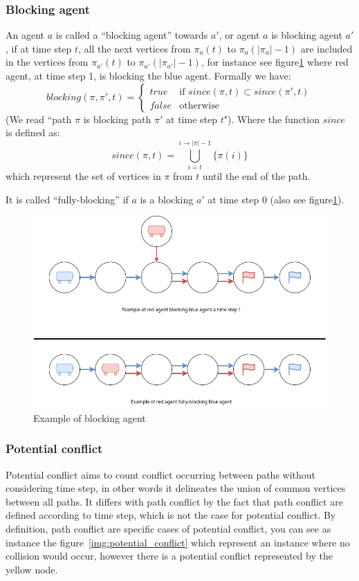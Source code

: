 \subsubsection{Blocking agent}\label{def:blocking_agent}
  An agent \(a\) is called a ``blocking agent'' towards \(a'\), or agent \(a\) is blocking agent \(a'\), if at time step \(t\), all the next vertices from \(\pi_a(t)\) to \(\pi_a(|\pi_a|-1)\) are included in the vertices from \(\pi_{a'}(t)\) to \(\pi_{a'}(|\pi_{a'}|-1)\), for instance see figure\ref{img:blocking_agent} where red agent, at time step 1, is blocking the blue agent. Formally we have: \
  \[
    blocking(\pi,\pi',t) = \begin{cases}
      true   & \text{if }  since(\pi,t) \subset  since(\pi',t) \\
      false  & \text{otherwise}
    \end{cases}
  \] (We read ``path \(\pi\) is blocking path \(\pi'\) at time step \(t\)"). Where the function \(since\) is defined as:
  \[
    since(\pi,t) = \bigcup_{i=t}^{i \rightarrow |\pi|-1} \{\pi(i)\}  
  \] which represent the set of vertices in \(\pi\) from \(t\) until the end of the path.
  
  It is called  ``fully-blocking''  if  \(a\) is a blocking \(a'\) at time step 0 (also see figure\ref{img:blocking_agent}). 
\begin{figure}[H]
  \centering
  \caption{Example of blocking agent}\label{img:blocking_agent}
  \includegraphics[width=\widthimg]{img/blocking_agent.drawio.png}
\end{figure}



\subsubsection{Potential conflict}
Potential conflict aims to count conflict occurring between paths without considering time step, in other words it delineates the union of common vertices between all paths. It differs with path conflict by the fact that path conflict are defined according to time step, which is not the case for potential conflict. By definition, path conflict are specific cases of potential conflict, you can see as instance the figure~\ref{img:potential_conflict} which represent an instance where no collision would occur, however there is a potential conflict represented by the yellow node. 

